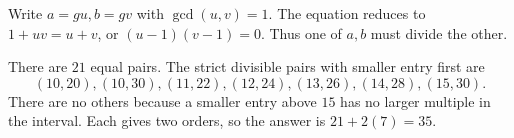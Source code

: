 Write $a=gu,b=gv$ with $\gcd(u,v)=1$. The equation reduces to $1+uv=u+v$, or $(u-1)(v-1)=0$. Thus one of $a,b$ must divide the other.

There are $21$ equal pairs. The strict divisible pairs with smaller entry first are
\[
(10,20),(10,30),(11,22),(12,24),(13,26),(14,28),(15,30).
\]
There are no others because a smaller entry above $15$ has no larger multiple in the interval. Each gives two orders, so the answer is $\boxed{21+2(7)=35}$.
